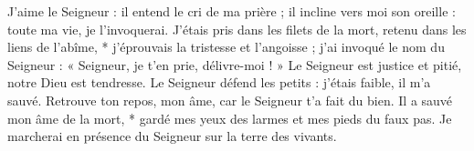 J'aime le Seigneur : il entend le cri de ma prière ;
\versseparator
il incline vers moi son oreille : toute ma vie, je l'invoquerai.
\versseparator
J'étais pris dans les filets de la mort, retenu dans les liens de l'abîme, * j'éprouvais la tristesse et l'angoisse ;
\versseparator
j'ai invoqué le nom du Seigneur : « Seigneur, je t'en prie, délivre-moi ! »
\versseparator
Le Seigneur est justice et pitié, notre Dieu est tendresse.
\versseparator
Le Seigneur défend les petits : j'étais faible, il m'a sauvé.
\versseparator
Retrouve ton repos, mon âme, car le Seigneur t'a fait du bien.
\versseparator
Il a sauvé mon âme de la mort, * gardé mes yeux des larmes et mes pieds du faux pas.
\versseparator
Je marcherai en présence du Seigneur sur la terre des vivants.
